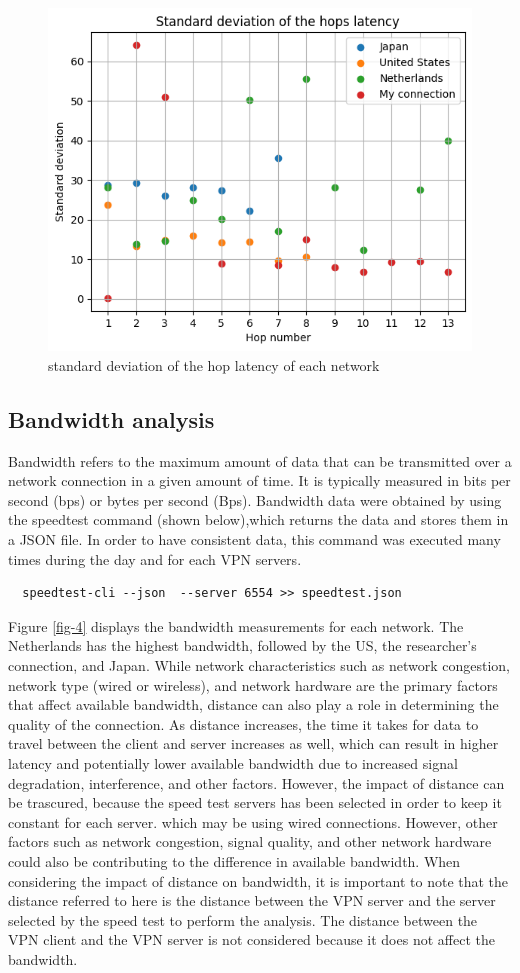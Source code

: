 \documentclass[eng]{class}
\begin{document}
\begin{figure}[H]
  \centering
  \includegraphics[width=.7\columnwidth]{images/varLHops.png}
  \caption{standard deviation of the hop latency of each network}
  \label{fig-3}
\end{figure}

\subsection{Bandwidth analysis}
Bandwidth refers to the maximum amount of data that can be transmitted over a network connection in a given amount of time.
It is typically measured in bits per second (bps) or bytes per second (Bps).
Bandwidth data were obtained by using the speedtest command (shown below),which returns the data and stores them in a JSON file.
In order to have consistent data, this command was executed many times during the day and for each VPN servers.
\begin{lstlisting}
  speedtest-cli --json  --server 6554 >> speedtest.json
\end{lstlisting}
Figure \ref*{fig-4} displays the bandwidth measurements for each network.
The Netherlands has the highest bandwidth, followed by the US, the researcher's connection, and Japan.\newline
While network characteristics such as network congestion, network type (wired or wireless),
and network hardware are the primary factors that affect available bandwidth, distance can also play a role in determining the quality of the connection.
As distance increases, the time it takes for data to travel between the client and server increases as well,
which can result in higher latency and potentially lower available bandwidth due to increased signal degradation, interference, and other factors.
However, the impact of distance can be trascured, because the speed test servers has been selected in order to keep it constant for each server.
which may be using wired connections. However, other factors such as network congestion, signal quality,
and other network hardware could also be contributing to the difference in available bandwidth.
When considering the impact of distance on bandwidth, it is important to note that the distance referred to here is the distance between the VPN server and
the server selected by the speed test to perform the analysis. The distance between the VPN client and the VPN server is not considered because it does not affect the bandwidth.
\end{document}
